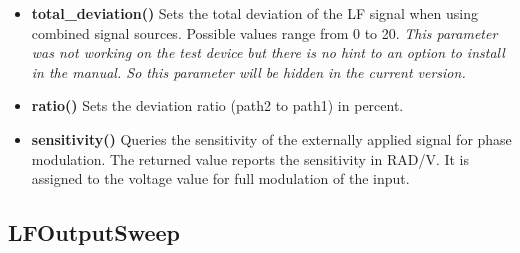 \documentclass[11pt]{article} %
\begin{document}
\begin{itemize}
\begin{itemize}[]
	\end{itemize}
	{\it This parameter was not working on the test device but there is no hint to an option to install in the manual. So this parameter will be hidden in the current version.}
\item {\bf total\_deviation()} Sets the total deviation of the LF signal when using combined signal sources. Possible values range from 0 to 20.
	{\it This parameter was not working on the test device but there is no hint to an option to install in the manual. So this parameter will be hidden in the current version.}
\item {\bf ratio()} Sets the deviation ratio (path2 to path1) in percent.
\item {\bf sensitivity()} Queries the sensitivity of the externally applied signal for phase modulation. The returned value reports the sensitivity in RAD/V. It is assigned to the voltage value for full modulation of the input.
\end{itemize}


\subsection{LFOutputSweep}
\end{document}
